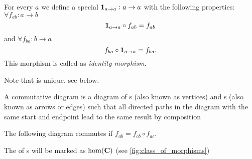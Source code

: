 \begin{definition}
  \label{def:id}
  For every  $a$ we define a special
   $\mathbf{1}_{ a \to a } : a \rightarrow a$ with the
  following properties: $\forall f_{ab} : a \rightarrow b$
  \begin{equation}
    \mathbf{1}_{ a \to a } \circ f_{ab} = f_{ab}
    \label{eq:leftid}
  \end{equation}
  and
  $\forall f_{ba} : b \rightarrow a$
  \begin{equation}
    f_{ba} \circ \mathbf{1}_{ a \to a }  = f_{ba}.
    \label{eq:rightid}
  \end{equation}
  This morphism is called as \textit{identity morphism}.
\end{definition}

Note that  is unique, see
 below.

\begin{definition}
  A commutative diagram is a diagram of s (also known as
  vertices) and s (also known as arrows or
  edges) such that all directed paths in the diagram with the same
  start and endpoint lead to the same result by composition
  \label{def:commutative_diagram}

  The following diagram commutes if $f_{ab} = f_{cb} \circ f_{ac}$.

  \begin{center}
  \end{center}
\end{definition}


\begin{remark}
  \label{rem:morphclass}
  The  of s will be marked as 
  $\mathrm{hom}(\mathbf{C})$ (see \cref{fig:class_of_morphisms})
\end{remark}

